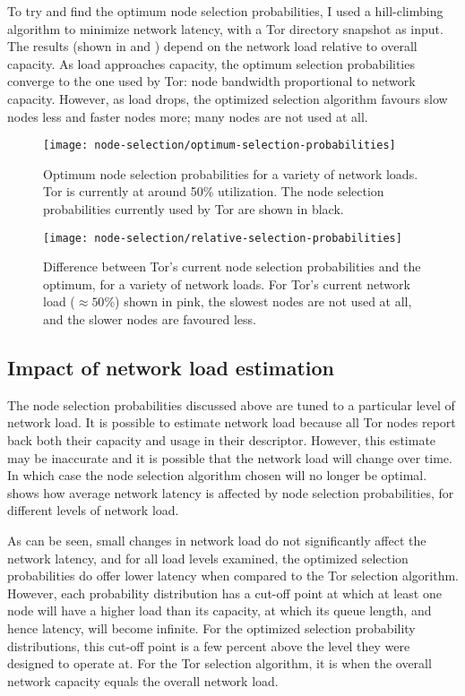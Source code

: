 \documentclass{article}
\begin{document}
To try and find the optimum node selection probabilities, I used a hill-climbing algorithm to minimize network latency, with a Tor directory snapshot as input.
The results (shown in  and ) depend on the network load relative to overall capacity.
As load approaches capacity, the optimum selection probabilities converge to the one used by Tor: node bandwidth proportional to network capacity.
However, as load drops, the optimized selection algorithm favours slow nodes less and faster nodes more; many nodes are not used at all.

\begin{figure}
\texttt{[image: node-selection/optimum-selection-probabilities]}
\caption{Optimum node selection probabilities for a variety of network loads. Tor is currently at around 50\% utilization. The node selection probabilities currently used by Tor are shown in black.}
\label{fig:optimum-selection}
\end{figure}

\begin{figure}
\texttt{[image: node-selection/relative-selection-probabilities]}
\caption{Difference between Tor's current node selection probabilities and the optimum, for a variety of network loads. For Tor's current network load ($\approx 50$\%) shown in pink, the slowest nodes are not used at all, and the slower nodes are favoured less.}
\label{fig:relative-selection}
\end{figure}

\subsection{Impact of network load estimation}

The node selection probabilities discussed above are tuned to a particular level of network load.
It is possible to estimate network load because all Tor nodes report back both their capacity and usage in their descriptor.
However, this estimate may be inaccurate and it is possible that the network load will change over time.
In which case the node selection algorithm chosen will no longer be optimal.
 shows how average network latency is affected by node selection probabilities, for different levels of network load.

As can be seen, small changes in network load do not significantly affect the network latency, and for all load levels examined, the optimized selection probabilities do offer lower latency when compared to the Tor selection algorithm.
However, each probability distribution has a cut-off point at which at least one node will have a higher load than its capacity, at which its queue length, and hence latency, will become infinite.
For the optimized selection probability distributions, this cut-off point is a few percent above the level they were designed to operate at.
For the Tor selection algorithm, it is when the overall network capacity equals the overall network load.
\end{document}
